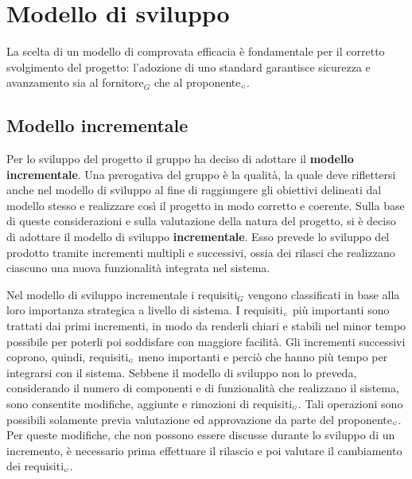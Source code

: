 \chapter{Modello di sviluppo}\label{ModelloDiSviluppo}
La scelta di un modello di comprovata efficacia è fondamentale per il corretto svolgimento del progetto: l'adozione di uno standard garantisce sicurezza e avanzamento sia al fornitore$_G$ che al proponente$_{\scaleto{G}{3pt}}$.
\section{Modello incrementale}\label{ModelloDiSviluppoModelloIncrementale}
Per lo sviluppo del progetto il gruppo ha deciso di adottare il \textbf{modello incrementale}.
Una prerogativa del gruppo è la qualità, la quale deve riflettersi anche nel modello di sviluppo al fine di raggiungere gli obiettivi delineati dal modello stesso e realizzare così il progetto in modo corretto e coerente.
Sulla base di queste considerazioni e sulla valutazione della natura del progetto, si è deciso di adottare il modello di sviluppo \textbf{incrementale}. Esso prevede lo sviluppo del prodotto tramite incrementi multipli e successivi, ossia dei rilasci che realizzano ciascuno una nuova funzionalità integrata nel sistema.

Nel modello di sviluppo incrementale i requisiti$_G$ vengono classificati in base alla loro importanza strategica a livello di sistema. I requisiti$_{\scaleto{G}{3pt}}$ più importanti sono trattati dai primi incrementi, in modo da renderli chiari e stabili nel minor tempo possibile per poterli poi soddisfare con maggiore facilità.
Gli incrementi successivi coprono, quindi, requisiti$_{\scaleto{G}{3pt}}$ meno importanti e perciò che hanno più tempo per integrarsi con il sistema.
Sebbene il modello di sviluppo non lo preveda, considerando il numero di componenti e di funzionalità che realizzano il sistema, sono consentite modifiche, aggiunte e rimozioni di requisiti$_{\scaleto{G}{3pt}}$.
Tali operazioni sono possibili solamente previa valutazione ed approvazione da parte del proponente$_{\scaleto{G}{3pt}}$. Per queste modifiche, che non possono essere discusse durante lo sviluppo di un incremento, è necessario prima effettuare il rilascio e poi valutare il cambiamento dei requisiti$_{\scaleto{G}{3pt}}$.

